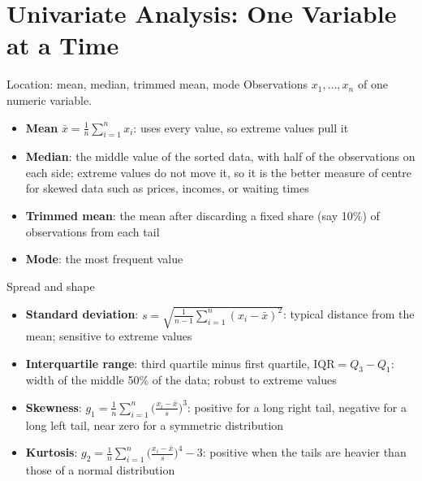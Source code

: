 \section{Univariate Analysis: One Variable at a Time}


\begin{frame}{Location: mean, median, trimmed mean, mode}
    Observations $x_1,\dots,x_n$ of one numeric variable.
    \svspace{0.5em}
    \begin{itemize}
        \item \textbf{Mean} $\bar{x}=\frac{1}{n}\sum_{i=1}^{n}x_i$: uses every value, so extreme values pull it
        \item \textbf{Median}: the middle value of the sorted data, with half of the observations on each side; extreme values do not move it, so it is the better measure of centre for skewed data such as prices, incomes, or waiting times
        \item \textbf{Trimmed mean}: the mean after discarding a fixed share (say 10\%) of observations from each tail
        \item \textbf{Mode}: the most frequent value
    \end{itemize}
\end{frame}


\begin{frame}{Spread and shape}
    \begin{itemize}
        \item \textbf{Standard deviation}: $s=\sqrt{\frac{1}{n-1}\sum_{i=1}^{n}(x_i-\bar{x})^2}$: typical distance from the mean; sensitive to extreme values
        \item \textbf{Interquartile range}: third quartile minus first quartile, $\mathrm{IQR}=Q_3-Q_1$: width of the middle 50\% of the data; robust to extreme values
        \item \textbf{Skewness}: $g_1=\frac{1}{n}\sum_{i=1}^{n}\bigl(\frac{x_i-\bar{x}}{s}\bigr)^{3}$: positive for a long right tail, negative for a long left tail, near zero for a symmetric distribution
        \item \textbf{Kurtosis}: $g_2=\frac{1}{n}\sum_{i=1}^{n}\bigl(\frac{x_i-\bar{x}}{s}\bigr)^{4}-3$: positive when the tails are heavier than those of a normal distribution
    \end{itemize}
\end{frame}


